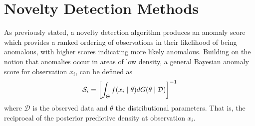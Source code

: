 \section{Novelty Detection Methods\label{sec:novelty}}
As previously stated, a novelty detection algorithm produces an anomaly score 
    which provides a ranked ordering of 
    observations in their likelihood of being
    anomalous, with higher scores indicating more likely anomalous. Building on 
    the notion that anomalies occur in areas of low density, a general Bayesian
    anomaly score for observation $x_i$, can be defined as
    \[
    \mathcal{S}_i = \left[\int_{\Theta}f(x_i\mid\theta)dG(\theta\mid\mathcal{D})\right]^{-1}
    \]
    where $\mathcal{D}$ is the observed data and $\theta$ the distributional
    parameters.  That is, the reciprocal of the posterior predictive density 
    at observation $x_i$.

